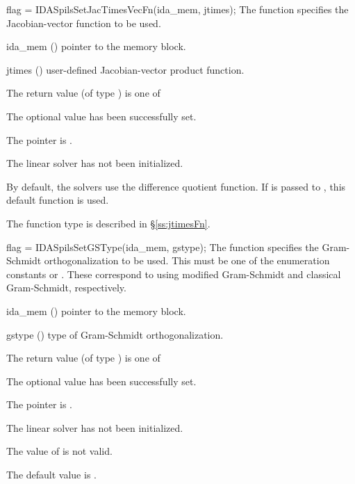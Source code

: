 {{}
{
  flag = IDASpilsSetJacTimesVecFn(ida\_mem, jtimes);
}
{
  The function  specifies the Jacobian-vector 
  function to be used.
}
{
  \begin{args}
  \item[ida\_mem] ()
    pointer to the {\ida} memory block.
  \item[jtimes] ()
    user-defined Jacobian-vector product function.
  \end{args}
}
{
  The return value  (of type ) is one of
  \begin{args}
  \item[\Id{IDASPILS\_SUCCESS}] 
    The optional value has been successfully set.
  \item[\Id{IDASPILS\_MEM\_NULL}]
    The  pointer is .
  \item[\Id{IDASPILS\_LMEM\_NULL}]
    The {\idaspils} linear solver has not been initialized.
  \end{args}
}
{
  By default, the {\idaspils} solvers use the difference quotient function. 
  If  is passed to , this default function is used.

  The function type  is described in \S\ref{ss:jtimesFn}.
}
{
  flag = IDASpilsSetGSType(ida\_mem, gstype);
}
{
  The function  specifies the 
  Gram-Schmidt orthogonalization to be used. 
  This must be one of the enumeration constants 
  or . These correspond to using modified Gram-Schmidt 
  and classical Gram-Schmidt, respectively. 
}
{
  \begin{args}
  \item[ida\_mem] ()
    pointer to the {\ida} memory block.
  \item[gstype] ()
    type of Gram-Schmidt orthogonalization.
  \end{args}
}
{
  The return value  (of type ) is one of
  \begin{args}
  \item[\Id{IDASPILS\_SUCCESS}] 
    The optional value has been successfully set.
  \item[\Id{IDASPILS\_MEM\_NULL}]
    The  pointer is .
  \item[\Id{IDASPILS\_LMEM\_NULL}]
    The {\idaspils} linear solver has not been initialized.
  \item[\Id{IDASPILS\_ILL\_INPUT}]
    The value of  is not valid.
  \end{args}
}
{
  The default value is .

}}
